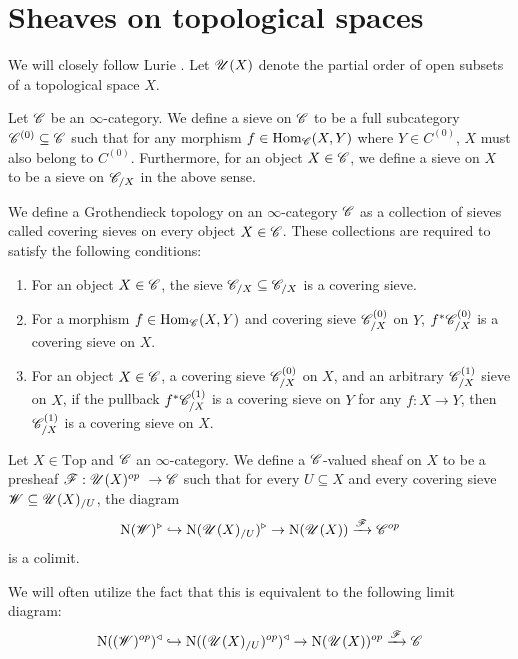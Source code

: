 \documentclass[../../thesis.tex]{subfiles}
\begin{document}
\section{Sheaves on topological spaces}
We will closely follow Lurie \cite{HTT}.
Let $\mathscr{U}(X)$ denote the partial order of open subsets of a topological space $X$.
\begin{definition}
    Let $\mathscr{C}$ be an $\infty$-category.
    We define a sieve on $\mathscr{C}$ to be a full subcategory $\mathscr{C}^{(0)} \subseteq \mathscr{C}$ such that for any morphism $f \in \mathrm{Hom}_{\mathscr{C}}(X,Y)$ where $Y\in C^{(0)}$, $X$ must also belong to $C^{(0)}$.
    Furthermore, for an object $X \in \mathscr{C}$, we define a sieve on $X$ to be a sieve on $\mathscr{C}_{/X}$ in the above sense.
\end{definition}
\begin{definition}
    We define a Grothendieck topology on an $\infty$-category $\mathscr{C}$ as a collection of sieves called covering sieves on every object $X\in \mathscr{C}$.
    These collections are required to satisfy the following conditions:
    \begin{enumerate}
        \item For an object $X\in \mathscr{C}$, the sieve $\mathscr{C}_{/X} \subseteq \mathscr{C}_{/X}$ is a covering sieve.
        \item For a morphism $f \in \mathrm{Hom}_{\mathscr{C}}(X,Y)$ and covering sieve $\mathscr{C}^{(0)}_{/X}$ on $Y$, $f^*\mathscr{C}^{(0)}_{/X}$ is a covering sieve on $X$.
        \item For an object $X \in \mathscr{C}$, a covering sieve $\mathscr{C}^{(0)}_{/X}$ on $X$, and an arbitrary  $\mathscr{C}^{(1)}_{/X}$ sieve on $X$, if the pullback $f^*\mathscr{C}^{(1)}_{/X}$ is a covering sieve on $Y$ for any $f: X \to Y$, then $\mathscr{C}^{(1)}_{/X}$ is a covering sieve on $X$.
    \end{enumerate}
\end{definition}
\begin{definition}\label{sheaf_on_top}
    Let $X \in \mathrm{Top}$ and $\mathscr{C}$ an $\infty$-category.
    We define a $\mathscr{C}$-valued sheaf on $X$ to be a presheaf $\F: \Open(X)^{op} \to \C$ such that for every $U\subseteq X$ and every covering sieve $\mathscr{W} \subseteq \mathscr{U}(X)_{/U}$, the diagram
    \[
        \mathrm{N}(\mathscr{W})^{\triangleright} \hookrightarrow \mathrm{N}(\mathscr{U}(X)_{/U})^{\triangleright} \rightarrow \mathrm{N}(\mathscr{U}(X))\xrightarrow{\mathscr{F}}\mathscr{C}^{op}
    \]
    is a colimit.
\end{definition}
\begin{remark}
    We will often utilize the fact that this is equivalent to the following limit diagram:
    \[
        \mathrm{N}((\mathscr{W})^{op})^{\triangleleft} \hookrightarrow \mathrm{N}((\mathscr{U}(X)_{/U})^{op})^{\triangleleft} \rightarrow \mathrm{N}(\mathscr{U}(X))^{op}\xrightarrow{\mathscr{F}}\mathscr{C}
    \]
\end{remark}
\end{document}

